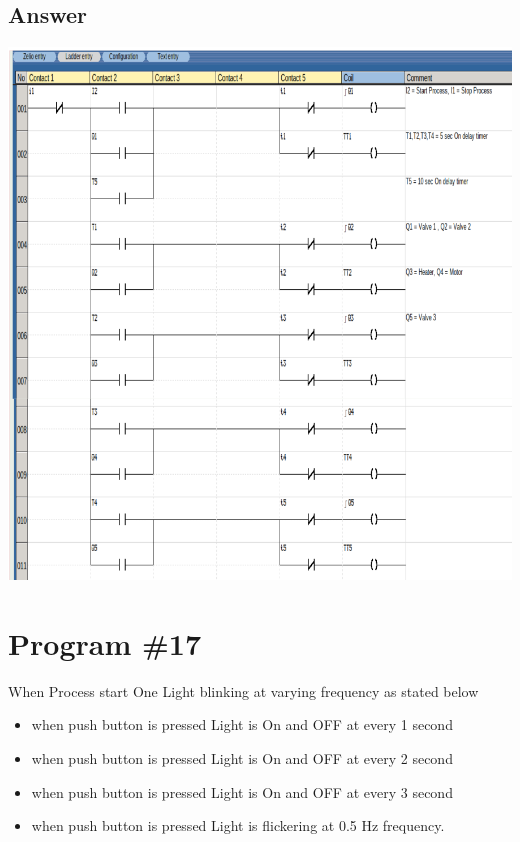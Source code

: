 \documentclass[
	12pt, %
]{fphw}
\begin{document}
 \subsection*{Answer}
   \begin{center}
    \includegraphics[width= 165mm, scale=0.90]{blender.png}
   \end{center}                                                                


  \section*{Program \#17}
  \begin{problem}
    When Process start One Light blinking at varying frequency as stated below
\medskip
    \begin{itemize}
      \item when  push button is pressed Light is On and OFF at every 1
        second
      \item when  push button is pressed Light is On and OFF at every 2
        second
      \item when  push button is pressed Light is On and OFF at every 3
        second
      \item when  push button is pressed Light is flickering at 0.5 Hz
        frequency.
    \end{itemize}
   \end{problem}
\end{document}
